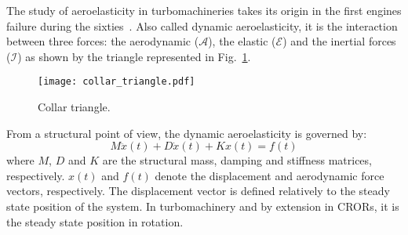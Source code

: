 
The study of aeroelasticity in turbomachineries takes its origin
in the first engines failure during the sixties~\cite{Dugundji2003}.
Also called dynamic aeroelasticity,
it is the interaction between three forces:
the aerodynamic ($\mathcal{A}$), the elastic ($\mathcal{E}$) and
the inertial forces ($\mathcal{I}$) as 
shown by the \citet{Collar1946} triangle represented in 
Fig.~\ref{fig:ael_collar_triangle}. 
\begin{figure}[htp]
  \centering
  \texttt{[image: collar\_triangle.pdf]}
  \caption{Collar triangle.}
  \label{fig:ael_collar_triangle}
\end{figure}

From a structural point of view, 
the dynamic aeroelasticity is governed by:
\begin{equation}
	M \ddot{x}(t) + D \dot{x}(t) + K x(t) = f(t)
	\label{eq:ael_motion_eq}
\end{equation}
where $M$, $D$ and $K$ are the structural mass, damping 
and stiffness matrices, respectively.
$x(t)$ and $f(t)$ denote the displacement 
and aerodynamic force vectors, respectively. The displacement
vector is defined relatively to the 
steady state position of the system. In turbomachinery
and by extension in CRORs, it is the steady state position
in rotation.
